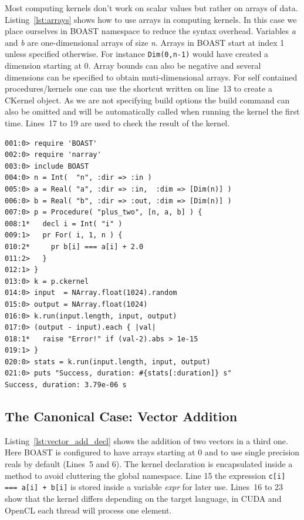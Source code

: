 \documentclass[11pt, a4paper, twoside]{montblanc}
\begin{document}
Most computing kernels don't work on scalar values but rather on arrays of
data. Listing~\ref{lst:arrays} shows how to use arrays in computing kernels.
In this case we place ourselves in BOAST namespace to reduce the syntax
overhead. Variables \textit{a} and \textit{b} are one-dimensional arrays of
size \textit{n}. Arrays in BOAST start at index 1 unless specified otherwise.
For instance \lstinline!Dim(0,n-1)! would have created a dimension starting at
0. Array bounds can also be negative and several dimensions can be specified
to obtain muti-dimensional arrays.
For self contained procedures/kernels one can use the shortcut written on
line~13 to create a CKernel object. As we are not specifying build options the
build command can also be omitted and will be automatically called when
running the kernel the first time. Lines~17 to 19 are used to check the result
of the kernel.

\begin{lstlisting}
001:0> require 'BOAST'
002:0> require 'narray'
003:0> include BOAST
004:0> n = Int(  "n", :dir => :in )
005:0> a = Real( "a", :dir => :in,  :dim => [Dim(n)] )
006:0> b = Real( "b", :dir => :out, :dim => [Dim(n)] )
007:0> p = Procedure( "plus_two", [n, a, b] ) {
008:1*   decl i = Int( "i" )
009:1>   pr For( i, 1, n ) {
010:2*     pr b[i] === a[i] + 2.0
011:2>   }
012:1> }
013:0> k = p.ckernel
014:0> input  = NArray.float(1024).random
015:0> output = NArray.float(1024)
016:0> k.run(input.length, input, output)
017:0> (output - input).each { |val|
018:1*   raise "Error!" if (val-2).abs > 1e-15
019:1> }
020:0> stats = k.run(input.length, input, output)
021:0> puts "Success, duration: #{stats[:duration]} s"
Success, duration: 3.79e-06 s
\end{lstlisting}

\subsection*{The Canonical Case: Vector Addition}

Listing~\ref{lst:vector_add_decl} shows the addition of two vectors in a third
one. Here BOAST is configured to have arrays starting at 0 and to use single
precision reals by default (Lines~5 and 6).  The kernel declaration is
encapsulated inside a method to avoid cluttering the global namespace. Line 15
the expression \lstinline!c[i] === a[i] + b[i]! is stored inside a variable
\textit{expr} for later use. Lines~16 to 23 show that the kernel differs
depending on the target language, in CUDA and OpenCL each thread will process
one element.
\end{document}
